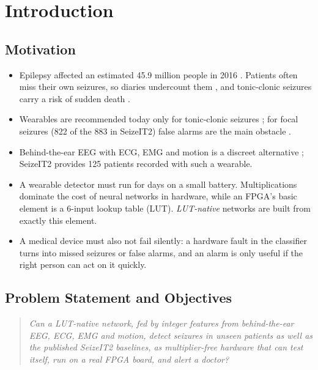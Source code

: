 \chapter{Introduction}\label{ch:intro}

\section{Motivation}

\begin{itemize}
\item Epilepsy affected an estimated 45.9 million people in 2016 \cite{gbd2019epilepsy}. Patients often miss their own
  seizures, so diaries undercount them \cite{elger2018underreporting}, and tonic-clonic seizures carry a risk of sudden
  death \cite{ryvlin2013mortemus}.
\item Wearables are recommended today only for tonic-clonic seizures \cite{beniczky2021guideline}; for focal seizures
  (822 of the 883 in SeizeIT2) false alarms are the main obstacle \cite{swinnen2026seizeit2}.
\item Behind-the-ear EEG with ECG, EMG and motion is a discreet alternative \cite{vandecasteele2020bte,vandecasteele2021ecg};
  SeizeIT2 \cite{bhagubai2025seizeit2} provides 125 patients recorded with such a wearable.
\item A wearable detector must run for days on a small battery. Multiplications dominate the cost of neural networks
  in hardware, while an FPGA's basic element is a 6-input lookup table (LUT). \emph{LUT-native} networks
  \cite{bacellar2024dwn,petersen2022dlgn,umuroglu2020logicnets} are built from exactly this element.
\item A medical device must also not fail silently: a hardware fault in the classifier turns into missed seizures or
  false alarms, and an alarm is only useful if the right person can act on it quickly.
\end{itemize}

\section{Problem Statement and Objectives}

\begin{quote}
\itshape Can a LUT-native network, fed by integer features from behind-the-ear EEG, ECG, EMG and motion, detect
seizures in unseen patients as well as the published SeizeIT2 baselines, as multiplier-free hardware that can test
itself, run on a real FPGA board, and alert a doctor?
\end{quote}

